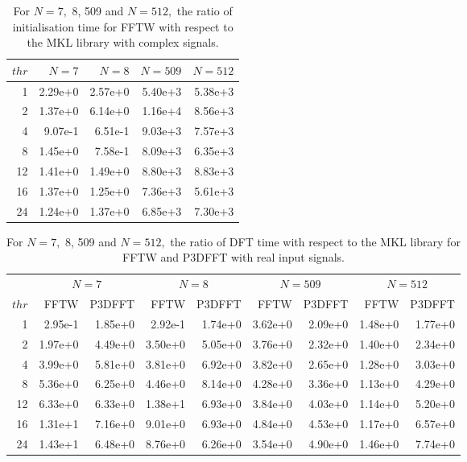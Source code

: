 \documentclass[a4paper]{article}
\begin{document}
\begin{table}
\begin{center}
\begin{tabular}{|r|r|r|r|r|}
  \hline
  $thr$ & $N=7$ & $N=8$ & $N=509$ & $N=512$ \\ \hline
   1  &      2.29e+0 &   2.57e+0 &   5.40e+3 &   5.38e+3  \\
   2  &      1.37e+0 &   6.14e+0 &   1.16e+4 &   8.56e+3  \\
   4  &      9.07e-1 &   6.51e-1 &   9.03e+3 &   7.57e+3  \\
   8  &      1.45e+0 &   7.58e-1 &   8.09e+3 &   6.35e+3  \\
   12 &      1.41e+0 &   1.49e+0 &   8.80e+3 &   8.83e+3  \\
   16 &      1.37e+0 &   1.25e+0 &   7.36e+3 &   5.61e+3  \\
   24 &      1.24e+0 &   1.37e+0 &   6.85e+3 &   7.30e+3  \\ \hline
\end{tabular}
\caption{ For $N=7,$ 8, 509 and $N=512,$ the ratio of initialisation time for FFTW with respect to the MKL library  with complex signals. }\label{Tbl:Init3dc}
\end{center}
\end{table}

\begin{table}
\begin{center}
\begin{tabular}{|r||r|r||r|r||r|r||r|r|}
  \hline
  &    \multicolumn{2}{|c||}{$N=7$} & \multicolumn{2}{|c||}{$N=8$} & \multicolumn{2}{|c||}{$N=509$} & \multicolumn{2}{|c|}{$N=512$}  \\
 $thr$  & FFTW & P3DFFT & FFTW & P3DFFT & FFTW & P3DFFT & FFTW & P3DFFT   \\  \hline 
   1  &   2.95e-1 &   1.85e+0 &   2.92e-1 &   1.74e+0 &   3.62e+0 &   2.09e+0 &   1.48e+0 &   1.77e+0  \\
   2  &   1.97e+0 &   4.49e+0 &   3.50e+0 &   5.05e+0 &   3.76e+0 &   2.32e+0 &   1.40e+0 &   2.34e+0   \\
   4  &   3.99e+0 &   5.81e+0 &   3.81e+0 &   6.92e+0 &   3.82e+0 &   2.65e+0 &   1.28e+0 &   3.03e+0   \\
   8  &   5.36e+0 &   6.25e+0 &   4.46e+0 &   8.14e+0 &   4.28e+0 &   3.36e+0 &   1.13e+0 &   4.29e+0   \\
   12 &   6.33e+0 &   6.33e+0 &   1.38e+1 &   6.93e+0 &   3.84e+0 &   4.03e+0 &   1.14e+0 &   5.20e+0  \\
   16 &   1.31e+1 &   7.16e+0 &   9.01e+0 &   6.93e+0 &   4.84e+0 &   4.53e+0 &   1.17e+0 &   6.57e+0   \\
   24 &   1.43e+1 &   6.48e+0 &   8.76e+0 &   6.26e+0 &   3.54e+0 &   4.90e+0 &   1.46e+0 &   7.74e+0    \\ \hline
\end{tabular}
\caption{ For $N=7,$ 8, 509 and $N=512,$ the ratio of DFT time with respect to the MKL library for FFTW and P3DFFT with real input signals. }\label{Tbl:DFT3dr}
\end{center}
\end{table}
\end{document}
